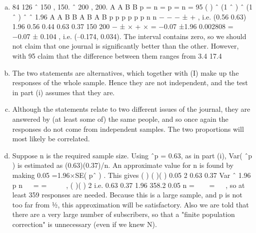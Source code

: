 \documentclass[a4paper,12pt]{article}
\begin{document}
\begin{enumerate}[(a)]
\item  84 126
ˆ 150 , 150. ˆ 200 , 200. A A B B p = n = p = n =
95%
( ) ˆ (1 ˆ ) ˆ (1 ˆ )
ˆ ˆ 1.96 A A B B
A B
A B
p p p p
p p
n n
− −
− ± + ,
i.e. (0.56 0.63) 1.96 0.56 0.44 0.63 0.37
150 200
− ± × + ×
= −0.07 ±1.96 0.002808 = −0.07 ± 0.104 ,
i.e. (–0.174, 0.034).
The interval contains zero, so we should not claim that one journal is
significantly better than the other. However, with 95%
claim that the difference between them ranges from 3.4%
17.4%
\item The two statements are alternatives, which together with (I) make up the
responses of the whole sample. Hence they are not independent, and the test
in part (i) assumes that they are.
\item Although the statements relate to two different issues of the journal, they are
answered by (at least some of) the same people, and so once again the
responses do not come from independent samples. The two proportions will
most likely be correlated.
\item Suppose n is the required sample size. Using ˆp = 0.63, as in part (i), Var( ˆp )
is estimated as (0.63)(0.37)/n. An approximate value for n is found by making
0.05 =1.96×SE( pˆ ) . This gives
( ) ( )( ) 0.05 2 0.63 0.37 Var ˆ
1.96
p
n
  = =  
 
,
( )( )
2 i.e. 0.63 0.37 1.96 358.2
0.05
n =   =
 
,
so at least 359 responses are needed.
Because this is a large sample, and p is not too far from ½, this approximation
will be satisfactory. Also we are told that there are a very large number of
subscribers, so that a "finite population correction" is unnecessary (even if we
knew N).
\end{enumerate}
\end{document}
